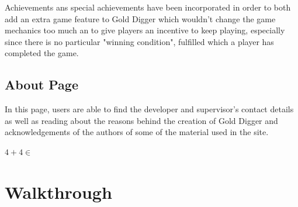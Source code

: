 \documentclass{mproj}
\begin{document}
Achievements ans special achievements have been incorporated in order to both add an extra game feature to Gold Digger which wouldn't change the game mechanics too much an to give players an incentive to keep playing, especially since there is no particular "winning condition", fulfilled which a player has completed the game.  

\subsection{About Page}

In this page, users are able to find  the developer and supervisor's contact details as well as reading about the reasons behind the creation of Gold Digger and acknowledgements of the authors of some of the material used in the site.

$4+4 \in $ \cite{BK08}

\section{Walkthrough}
\end{document}
